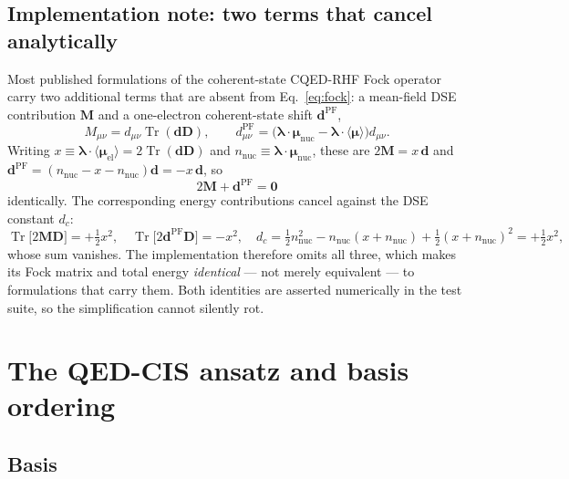 \documentclass[11pt]{article}
\newcommand{\lam}{\bm{\lambda}}
\DeclareMathOperator{\Tr}{Tr}
\begin{document}
\subsection{Implementation note: two terms that cancel analytically}
\label{sec:cancellation}

Most published formulations of the coherent-state CQED-RHF Fock operator carry
two additional terms that are absent from Eq.~\eqref{eq:fock}: a mean-field DSE
contribution $\bm{M}$ and a one-electron coherent-state shift $\bm{d}^{\mathrm{PF}}$,
\begin{equation}
M_{\mu\nu} = d_{\mu\nu} \Tr(\bm{d}\bm{D}), \qquad
d^{\mathrm{PF}}_{\mu\nu}
 = \bigl(\lam\cdot\bm{\mu}_{\mathrm{nuc}} - \lam\cdot\langle\bm{\mu}\rangle\bigr) d_{\mu\nu}.
\end{equation}
Writing $x \equiv \lam\cdot\langle\bm{\mu}_{\mathrm{el}}\rangle = 2\Tr(\bm{d}\bm{D})$
and $n_{\mathrm{nuc}} \equiv \lam\cdot\bm{\mu}_{\mathrm{nuc}}$, these are
$2\bm{M} = x\,\bm{d}$ and
$\bm{d}^{\mathrm{PF}} = (n_{\mathrm{nuc}} - x - n_{\mathrm{nuc}})\bm{d} = -x\,\bm{d}$, so
\begin{equation}
\boxed{\; 2\bm{M} + \bm{d}^{\mathrm{PF}} = \bm{0} \;}
\label{eq:fockcancel}
\end{equation}
identically. The corresponding energy contributions cancel against the DSE
constant $d_c$:
\begin{equation}
\Tr\bigl[2\bm{M}\bm{D}\bigr] = +\tfrac{1}{2}x^2, \quad
\Tr\bigl[2\bm{d}^{\mathrm{PF}}\bm{D}\bigr] = -x^2, \quad
d_c = \tfrac{1}{2}n_{\mathrm{nuc}}^2 - n_{\mathrm{nuc}}(x + n_{\mathrm{nuc}}) + \tfrac{1}{2}(x+n_{\mathrm{nuc}})^2 = +\tfrac{1}{2}x^2,
\label{eq:encancel}
\end{equation}
whose sum vanishes. The implementation therefore omits all three, which makes
its Fock matrix and total energy \emph{identical} --- not merely equivalent --- to
formulations that carry them. Both identities are asserted numerically in the
test suite, so the simplification cannot silently rot.

\section{The QED-CIS ansatz and basis ordering}
\label{sec:basis}

\subsection{Basis}
\end{document}

